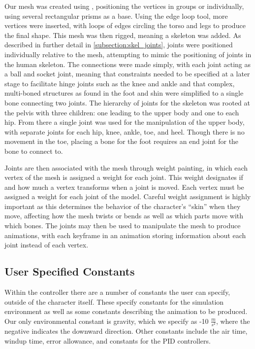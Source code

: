Our mesh was created using \maya, positioning the vertices in groups or individually, using several rectangular prisms as a base.  Using the edge loop tool, more vertices were inserted, with loops of edges circling the torso and legs to produce the final shape.  This mesh was then rigged, meaning a skeleton was added.  As described in further detail in \ref{subsection:skel_joints}, joints were positioned individually relative to the mesh, attempting to mimic the positioning of joints in the human skeleton.  The connections were made simply, with each joint acting as a ball and socket joint, meaning that constraints needed to be specified at a later stage to facilitate hinge joints such as the knee and ankle and that complex, multi-boned structures as found in the foot and shin were simplified to a single bone connecting two joints.  The hierarchy of joints for the skeleton was rooted at the pelvis with three children: one leading to the upper body and one to each hip.  From there a single joint was used for the manipulation of the upper body, with separate joints for each hip, knee, ankle, toe, and heel.  Though there is no movement in the toe, placing a bone for the foot requires an end joint for the bone to connect to.

Joints are then associated with the mesh through weight painting, in which each vertex of the mesh is assigned a weight for each joint.  This weight designates if and how much a vertex transforms when a joint is moved.  Each vertex must be assigned a weight for each joint of the model.  Careful weight assignment is highly important as this determines the behavior of the character's ``skin'' when they move, affecting how the mesh twists or bends as well as which parts move with which bones.  The joints may then be used to manipulate the mesh to produce animations, with each keyframe in an animation storing information about each joint instead of each vertex.

\subsection{User Specified Constants}
\label{subsection:user_constants}
Within the controller there are a number of constants the user can specify, outside of the character itself.  These specify constants for the simulation environment as well as some constants describing the animation to be produced.  Our only environmental constant is gravity, which we specify as -10 $\frac{m}{s^2}$, where the negative indicates the downward direction.  Other constants include the air time, windup time, error allowance, and constants for the PID controllers.


